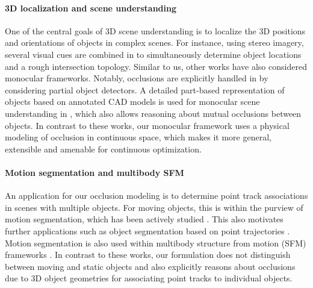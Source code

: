\paragraph{3D localization and scene understanding}
One of the central goals of 3D scene understanding is to localize the 3D positions and orientations of objects in complex scenes. For instance, using stereo imagery, several visual cues are combined in \cite{Geiger_etal_2014} to simultaneously determine object locations and a rough intersection topology. Similar to us, other works have also considered monocular frameworks. Notably, occlusions are explicitly handled in \cite{Wojek_etal_2013} by considering partial object detectors. A detailed part-based representation of objects based on annotated CAD models is used for monocular scene understanding in \cite{Zia_etal_2013,Zia_etal_2014}, which also allows reasoning about mutual occlusions between objects. In contrast to these works, our monocular framework uses a physical modeling of occlusion in continuous space, which makes it more general, extensible and amenable for continuous optimization.

\paragraph{Motion segmentation and multibody SFM}
An application for our occlusion modeling is to determine point track associations in scenes with multiple objects. For moving objects, this is within the purview of motion segmentation, which has been actively studied \cite{Tron_Vidal_2007,Rao_etal_2010}. This also motivates further applications such as object segmentation based on point trajectories \cite{Brox_Malik_2010}. Motion segmentation is also used within multibody structure from motion (SFM) frameworks \cite{Ozden_etal_2010,Kundu_etal_2011,Namdev2012}. In contrast to these works, our formulation does not distinguish between moving and static objects and also explicitly reasons about occlusions due to 3D object geometries for associating point tracks to individual objects.







